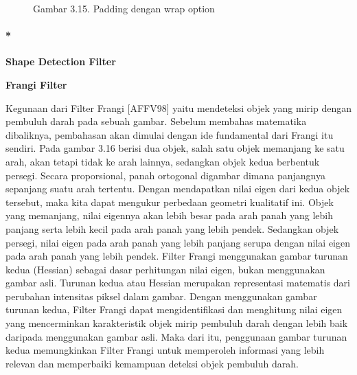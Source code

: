 \documentclass[
  letterpaper,
  DIV=11,
  numbers=noendperiod]{scrreprt}
\let\oldparagraph\paragraph
\renewcommand{\paragraph}[1]{\oldparagraph{#1}\mbox{}}
\begin{document}
\begin{figure}
\begin{minipage}[t]{0.50\linewidth}
{{}

\caption{Gambar 3.15. Padding dengan wrap option}

}

\end{minipage}%

\end{figure}

\hypertarget{shape-detection-filter}{%
\paragraph*{\texorpdfstring{\textbf{Shape Detection
Filter}}{Shape Detection Filter}}\label{shape-detection-filter}}

\textbf{Frangi Filter}

Kegunaan dari Filter Frangi {[}AFFV98{]} yaitu mendeteksi objek yang
mirip dengan pembuluh darah pada sebuah gambar. Sebelum membahas
matematika dibaliknya, pembahasan akan dimulai dengan ide fundamental
dari Frangi itu sendiri. Pada gambar 3.16 berisi dua objek, salah satu
objek memanjang ke satu arah, akan tetapi tidak ke arah lainnya,
sedangkan objek kedua berbentuk persegi. Secara proporsional, panah
ortogonal digambar dimana panjangnya sepanjang suatu arah tertentu.
Dengan mendapatkan nilai eigen dari kedua objek tersebut, maka kita
dapat mengukur perbedaan geometri kualitatif ini. Objek yang memanjang,
nilai eigennya akan lebih besar pada arah panah yang lebih panjang serta
lebih kecil pada arah panah yang lebih pendek. Sedangkan objek persegi,
nilai eigen pada arah panah yang lebih panjang serupa dengan nilai eigen
pada arah panah yang lebih pendek. Filter Frangi menggunakan gambar
turunan kedua (Hessian) sebagai dasar perhitungan nilai eigen, bukan
menggunakan gambar asli. Turunan kedua atau Hessian merupakan
representasi matematis dari perubahan intensitas piksel dalam gambar.
Dengan menggunakan gambar turunan kedua, Filter Frangi dapat
mengidentifikasi dan menghitung nilai eigen yang mencerminkan
karakteristik objek mirip pembuluh darah dengan lebih baik daripada
menggunakan gambar asli. Maka dari itu, penggunaan gambar turunan kedua
memungkinkan Filter Frangi untuk memperoleh informasi yang lebih relevan
dan memperbaiki kemampuan deteksi objek pembuluh darah.
\end{document}

